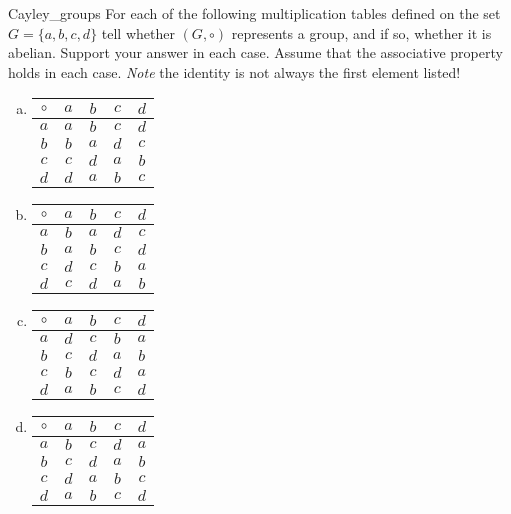 \begin{exercise}{Cayley_groups}
For each of the following multiplication tables defined on the set $G = \{ a, b, c, d \}$ tell whether $(G, \circ)$ represents a group, and if so,  whether it is abelian.  Support your answer in each case.  Assume that the associative property holds in each case. \emph{Note} the identity is not always the first element listed!
\begin{multicols}{2}
\begin{enumerate}[(a)]

\item
\begin{center}
\begin{tabular}{c|cccc}
$\circ$ & $a$ & $b$ & $c$ & $d$ \\
\hline
$a$ & $a$ & $b$ & $c$ & $d$ \\
$b$ & $b$ & $a$ & $d$ & $c$ \\
$c$ & $c$ & $d$ & $a$ & $b$ \\
$d$ & $d$ & $a$ & $b$ & $c$
\end{tabular}
\end{center}
\smallskip


\item
\begin{center}
\begin{tabular}{c|cccc}
$\circ$ & $a$ & $b$ & $c$ & $d$ \\
\hline
$a$ & $b$ & $a$ & $d$ & $c$ \\
$b$ & $a$ & $b$ & $c$ & $d$ \\
$c$ & $d$ & $c$ & $b$ & $a$ \\
$d$ & $c$ & $d$ & $a$ & $b$
\end{tabular}
\end{center}
\smallskip
 
 
\item
\begin{center}
\begin{tabular}{c|cccc}
$\circ$ & $a$ & $b$ & $c$ & $d$ \\
\hline
$a$ & $d$ & $c$ & $b$ & $a$ \\
$b$ & $c$ & $d$ & $a$ & $b$ \\
$c$ & $b$ & $c$ & $d$ & $a$ \\
$d$ & $a$ & $b$ & $c$ & $d$
\end{tabular}
\end{center}
\smallskip

\item
\begin{center}
\begin{tabular}{c|cccc}
$\circ$ & $a$ & $b$ & $c$ & $d$ \\
\hline
$a$ & $b$ & $c$ & $d$ & $a$ \\
$b$ & $c$ & $d$ & $a$ & $b$ \\
$c$ & $d$ & $a$ & $b$ & $c$ \\
$d$ & $a$ & $b$ & $c$ & $d$
\end{tabular}
\end{center}
\end{enumerate}
\end{multicols}
\end{exercise}


